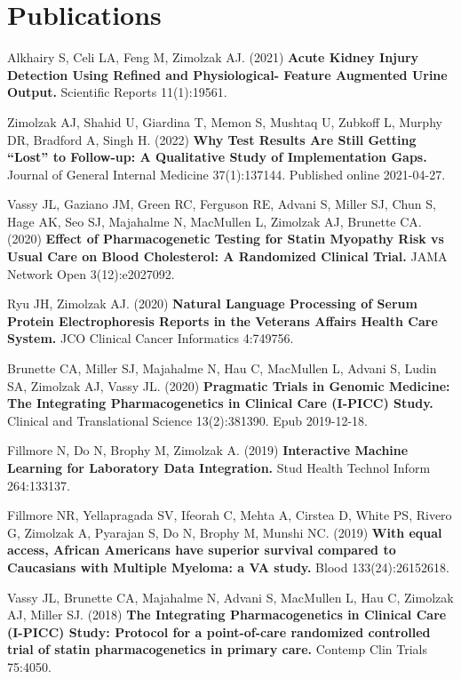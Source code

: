 \documentclass[10pt]{article}
\begin{document}
\section*{Publications}


Alkhairy S, Celi LA, Feng M, Zimolzak AJ. (2021) \textbf{Acute Kidney Injury
Detection Using Refined and Physiological- Feature Augmented Urine
Output.} Scientific Reports 11(1):19561.

Zimolzak AJ, Shahid U, Giardina T, Memon S, Mushtaq U, Zubkoff L,
Murphy DR, Bradford A, Singh H. (2022) \textbf{Why Test Results Are
  Still Getting ``Lost'' to Follow-up: A Qualitative Study of
  Implementation Gaps.} Journal of General Internal Medicine
37(1):137\ndash{}144. Published online 2021-04-27.

Vassy JL, Gaziano JM, Green RC, Ferguson RE, Advani S, Miller SJ, Chun
S, Hage AK, Seo SJ, Majahalme N, MacMullen L, Zimolzak AJ, Brunette
CA. (2020) \textbf{Effect of Pharmacogenetic Testing for Statin
  Myopathy Risk vs Usual Care on Blood Cholesterol: A Randomized
  Clinical Trial.} JAMA Network Open 3(12):e2027092.

Ryu JH, Zimolzak AJ. (2020) \textbf{Natural Language Processing of
  Serum Protein Electrophoresis Reports in the Veterans Affairs Health
  Care System.} JCO Clinical Cancer Informatics 4:749\ndash{}756.

Brunette CA, Miller SJ, Majahalme N, Hau C, MacMullen L, Advani S,
Ludin SA, Zimolzak AJ, Vassy JL. (2020) \textbf{Pragmatic Trials in
  Genomic Medicine: The Integrating Pharmacogenetics in Clinical Care
  (I-PICC) Study.} Clinical and Translational Science
13(2):381\ndash{}390. Epub 2019-12-18.

Fillmore N, Do N, Brophy M, Zimolzak A. (2019) \textbf{Interactive
  Machine Learning for Laboratory Data Integration.} Stud Health
Technol Inform 264:133\ndash{}137.

Fillmore NR, Yellapragada SV, Ifeorah C, Mehta A, Cirstea D, White PS,
Rivero G, Zimolzak A, Pyarajan S, Do N, Brophy M, Munshi NC. (2019)
\textbf{With equal access, African Americans have superior survival
  compared to Caucasians with Multiple Myeloma: a VA study.} Blood
133(24):2615\ndash{}2618.

Vassy JL, Brunette CA, Majahalme N, Advani S, MacMullen L, Hau C,
Zimolzak AJ, Miller SJ. (2018) \textbf{The Integrating
  Pharmacogenetics in Clinical Care (I-PICC) Study: Protocol for a
  point-of-care randomized controlled trial of statin pharmacogenetics
  in primary care.} Contemp Clin Trials 75:40\ndash{}50.
\end{document}
